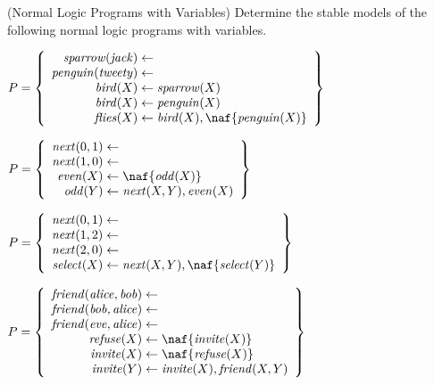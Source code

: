 \begin{Uebung}{(Normal Logic Programs with Variables)}%
Determine the stable models of the following normal logic programs with variables.
\begin{UList}
\item
\(
P =
\left\{
\begin{array}{r@{{}\leftarrow{}}l}
    \mathit{sparrow}(\mathit{jack})        \\
    \mathit{penguin}(\mathit{tweety})      \\
    \mathit{bird}(X)  & \mathit{sparrow}(X) \\
    \mathit{bird}(X)  & \mathit{penguin}(X) \\
    \mathit{flies}(X) & \mathit{bird}(X), \naf{\mathit{penguin}(X)}
\end{array}
\right\}
\)
\item 
\(
P =
\left\{
\begin{array}{r@{{}\leftarrow{}}l}
    \mathit{next}(0,1) \\
    \mathit{next}(1,0) \\
    \mathit{even}(X) & \naf{\mathit{odd}(X)} \\
    \mathit{odd}(Y)  & \mathit{next}(X,Y), \mathit{even}(X)
\end{array}
\right\}
\)
\item
\(
P =
\left\{
\begin{array}{r@{{}\leftarrow{}}l}
    \mathit{next}(0,1) \\
    \mathit{next}(1,2) \\
    \mathit{next}(2,0) \\
    \mathit{select}(X)   & \mathit{next}(X,Y), \naf{\mathit{select}(Y)}
\end{array}
\right\}
\)
\item
\(
P =
\left\{
\begin{array}{r@{{}\leftarrow{}}l}
    \mathit{friend}(\mathit{alice},\mathit{bob})  \\
    \mathit{friend}(\mathit{bob},\mathit{alice})  \\
    \mathit{friend}(\mathit{eve},\mathit{alice})  \\
    \mathit{refuse}(X) & \naf{\mathit{invite}(X)} \\
    \mathit{invite}(X) & \naf{\mathit{refuse}(X)} \\
    \mathit{invite}(Y) & \mathit{invite}(X), \mathit{friend}(X,Y)
\end{array}
\right\}
\)
\end{UList}
\end{Uebung}

